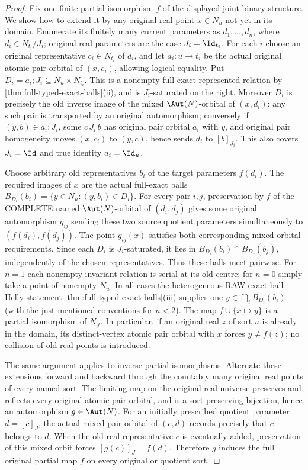 \begin{proof}
Fix one finite partial isomorphism $f$ of the displayed joint
binary structure.  We show how to extend it by any original real
point $x\in N_u$ not yet in its domain.  Enumerate its finitely
many current parameters as $d_1,\ldots,d_n$, where
$d_i\in N_{t_i}/J_i$; original real parameters are the case
$J_i=\Id_{t_i}$.  For each $i$ choose an original representative
$c_i\in N_{t_i}$ of $d_i$, and let
$a_i:u\to t_i$ be the actual original atomic pair orbital of
$(x,c_i)$, allowing logical equality.  Put
$D_i=a_i;J_i\subseteq N_u\times N_{t_i}$.
This is a nonempty full exact represented relation by
\cref{thm:full-typed-exact-balls}(ii), and is $J_i$-saturated
on the right.  Moreover $D_i$ is precisely the old inverse
image of the mixed $\Aut(N)$-orbital of $(x,d_i)$:
any such pair is transported by an original automorphism;
conversely if $(y,b)\in a_i;J_i$, some $c\,J_i\,b$ has
original pair orbital $a_i$ with $y$, and original pair
homogeneity moves $(x,c_i)$ to $(y,c)$, hence sends $d_i$
to $[b]_{J_i}$.  This also covers $J_i=\Id$ and true
identity $a_i=\Id_u$.

Choose arbitrary old representatives $b_i$ of the target
parameters $f(d_i)$.  The required images of $x$ are the
actual full-exact balls
$B_{D_i}(b_i)=\{y\in N_u:(y,b_i)\in D_i\}$.
For every pair $i,j$, preservation by $f$ of the COMPLETE
named $\Aut(N)$-orbital of $(d_i,d_j)$ gives some original
automorphism $g_{ij}$ sending these two source quotient
parameters simultaneously to $(f(d_i),f(d_j))$.  The point
$g_{ij}(x)$ satisfies both corresponding mixed orbital
requirements.  Since each $D_i$ is $J_i$-saturated, it lies
in $B_{D_i}(b_i)\cap B_{D_j}(b_j)$, independently of the
chosen representatives.  Thus these balls meet pairwise.
For $n=1$ each nonempty invariant relation is serial at its
old centre; for $n=0$ simply take a point of nonempty $N_u$.
In all cases the heterogeneous RAW exact-ball Helly statement
\cref{thm:full-typed-exact-balls}(iii) supplies one
$y\in\bigcap_i B_{D_i}(b_i)$ (with the just mentioned
conventions for $n<2$).  The map $f\cup\{x\mapsto y\}$ is
a partial isomorphism of $N_{\mathcal J}$.  In particular,
if an original real $z$ of sort $u$ is already in the domain,
its distinct-vertex atomic pair orbital with $x$ forces
$y\ne f(z)$; no collision of old real points is introduced.

The same argument applies to inverse partial isomorphisms.
Alternate these extensions forward and backward through the
countably many original real points of every named sort.
The limiting map on the original real universe preserves and
reflects every original atomic pair orbital, and is a
sort-preserving bijection, hence an automorphism $g\in\Aut(N)$.
For an initially prescribed quotient parameter $d=[c]_J$,
the actual mixed pair orbital of $(c,d)$ records precisely
that $c$ belongs to $d$.  When the old real representative
$c$ is eventually added, preservation of this mixed orbit
forces $[g(c)]_J=f(d)$.  Therefore $g$ induces the full
original partial map $f$ on every original or quotient sort.
\end{proof}

